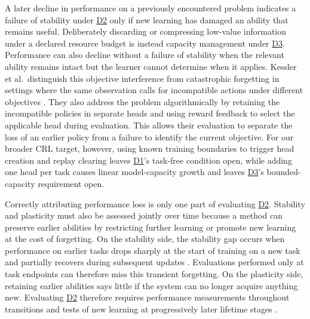 \documentclass[10pt,journal,compsoc]{IEEEtran}
\DeclareRobustCommand{\Dref}[1]{\hyperref[sec:d#1]{D#1}}
\begin{document}
A later decline in performance on a previously encountered problem indicates a failure of stability under \Dref{2} only if new learning has damaged an ability that remains useful.
Deliberately discarding or compressing low-value information under a declared resource budget is instead capacity management under \Dref{3}.
Performance can also decline without a failure of stability when the relevant ability remains intact but the learner cannot determine when it applies.
Kessler et al.\ distinguish this objective interference from catastrophic forgetting in settings where the same observation calls for incompatible actions under different objectives \cite{kessler2022}.
They also address the problem algorithmically by retaining the incompatible policies in separate heads and using reward feedback to select the applicable head during evaluation.
This allows their evaluation to separate the loss of an earlier policy from a failure to identify the current objective.
For our broader CRL target, however, using known training boundaries to trigger head creation and replay clearing leaves \Dref{1}'s task-free condition open, while adding one head per task causes linear model-capacity growth and leaves \Dref{3}'s bounded-capacity requirement open.

Correctly attributing performance loss is only one part of evaluating \Dref{2}.
Stability and plasticity must also be assessed jointly over time because a method can preserve earlier abilities by restricting further learning or promote new learning at the cost of forgetting.
On the stability side, the stability gap occurs when performance on earlier tasks drops sharply at the start of training on a new task and partially recovers during subsequent updates \cite{delange2023}.
Evaluations performed only at task endpoints can therefore miss this transient forgetting.
On the plasticity side, retaining earlier abilities says little if the system can no longer acquire anything new.
Evaluating \Dref{2} therefore requires performance measurements throughout transitions and tests of new learning at progressively later lifetime stages \cite{dohare2024}.
\end{document}
